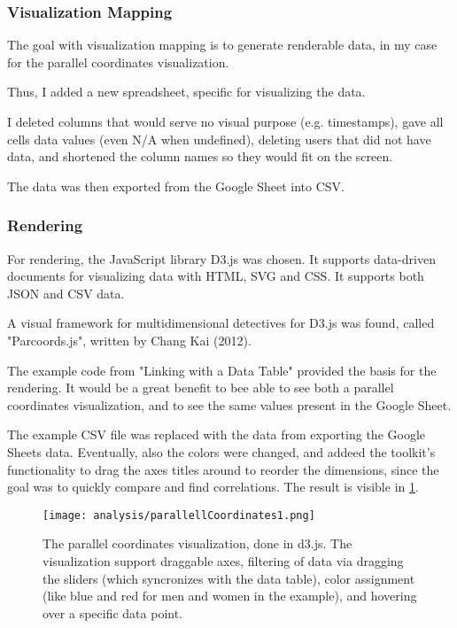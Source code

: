 \subsubsection{Visualization Mapping}
The goal with visualization mapping is to generate renderable data, in my case for the parallel coordinates visualization.

Thus, I added a new spreadsheet, specific for visualizing the data.

I deleted columns that would serve no visual purpose (e.g. timestamps), gave all cells data values (even N/A when undefined), deleting users that did not have data, and shortened the column names so they would fit on the screen.

The data was then exported from the Google Sheet into CSV.

\subsubsection{Rendering}

For rendering, the JavaScript library D3.js was chosen. It supports data-driven documents for visualizing data with HTML, SVG and CSS. It supports both JSON and CSV data.

A visual framework for multidimensional detectives for D3.js was found, called "Parcoords.js", written by Chang Kai (2012).

The example code from "Linking with a Data Table" provided the basis for the rendering. It would be a great benefit to bee able to see both a parallel coordinates visualization, and to see the same values present in the Google Sheet. %

The example CSV file was replaced with the data from exporting the Google Sheets data. Eventually, also the colors were changed, and addeed the toolkit's functionality to drag the axes titles around to reorder the dimensions, since the goal was to quickly compare and find correlations. The result is visible in \ref{fig:parallell-coordinates-1}.

\begin{figure}[h]
    \centering
    \texttt{[image: analysis/parallellCoordinates1.png]}
    \caption{The parallel coordinates visualization, done in d3.js. The visualization support draggable axes, filtering of data via dragging the sliders (which syncronizes with the data table), color assignment (like blue and red for men and women in the example), and hovering over a specific data point.}
    \label{fig:parallell-coordinates-1}
\end{figure}
